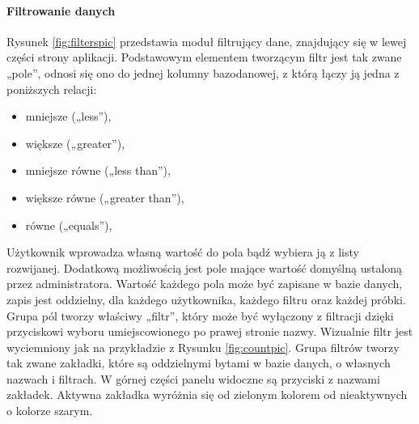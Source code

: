 \documentclass[a4paper,12pt,twoside]{article}
\begin{document}
\newpage
\paragraph{Filtrowanie danych}
Rysunek \ref{fig:filterspic} przedstawia moduł filtrujący dane, znajdujący się w
lewej części strony aplikacji.
Podstawowym elementem tworzącym filtr jest tak zwane „pole”, odnosi się ono do jednej kolumny
bazodanowej, z którą łączy ją jedna z poniższych relacji:

\begin{itemize}
\item mniejsze („less”),
\item większe („greater”),
\item mniejsze równe („less than”),
\item większe równe („greater than”),
\item równe („equals”),
\end{itemize}

Użytkownik wprowadza własną wartość do pola bądź wybiera ją z listy rozwijanej.
Dodatkową możliwością jest pole mające wartość domyślną ustaloną przez administratora.
Wartość każdego pola może być zapisane w bazie danych, zapis jest oddzielny, dla każdego
użytkownika, każdego filtru oraz każdej próbki.
Grupa pól tworzy właściwy „filtr”, który może być wyłączony z filtracji dzięki
przyciskowi wyboru umiejscowionego po prawej stronie nazwy. Wizualnie filtr jest wyciemniony jak na przykładzie z Rysunku \ref{fig:countpic}.
Grupa filtrów tworzy tak zwane zakładki, które są oddzielnymi bytami w bazie danych, o własnych nazwach i filtrach.
W górnej części panelu widoczne są przyciski z nazwami zakładek. Aktywna zakładka
wyróżnia się od zielonym kolorem od nieaktywnych o kolorze szarym.
\end{document}

